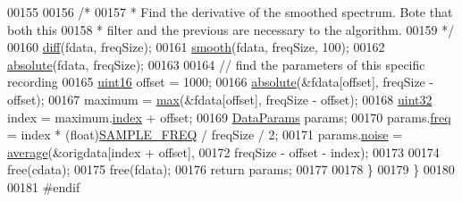 \begin{DoxyCode}
00155 
00156         \textcolor{comment}{/*}
00157 \textcolor{comment}{         * Find the derivative of the smoothed spectrum. Bote that both this}
00158 \textcolor{comment}{         * filter and the previous are necessary to the algorithm.}
00159 \textcolor{comment}{         */}
00160         \hyperlink{namespacevaso_a7d108bce812e906d8b1810815774c7ea}{diff}(fdata, freqSize);
00161         \hyperlink{namespacevaso_a5b7fc1a58199e2cac989f417a9faa1ce}{smooth}(fdata, freqSize, 100);
00162         \hyperlink{namespacevaso_a6ca90add966ce1773fc59a6883e6cd0c}{absolute}(fdata, freqSize);
00163 
00164         \textcolor{comment}{// find the parameters of this specific recording}
00165         \hyperlink{definitions_8hpp_a05f6b0ae8f6a6e135b0e290c25fe0e4e}{uint16} offset = 1000;
00166         \hyperlink{namespacevaso_a6ca90add966ce1773fc59a6883e6cd0c}{absolute}(&fdata[offset], freqSize - offset);
00167         maximum = \hyperlink{namespacevaso_a122846d728be312454a452d379915e10}{max}(&fdata[offset], freqSize - offset);
00168         \hyperlink{definitions_8hpp_a1134b580f8da4de94ca6b1de4d37975e}{uint32} index = maximum.\hyperlink{structMaximum_a2e6aef03795cd285fe542d0861c6e3b5}{index} + offset;
00169         \hyperlink{structDataParams}{DataParams} params;
00170         params.\hyperlink{structDataParams_a12566e017407647bc8287d62554ad3fb}{freq} = index * (float)\hyperlink{definitions_8hpp_a9401e43a8c86acafb31c8e2709baefa1}{SAMPLE\_FREQ} / freqSize / 2;
00171         params.\hyperlink{structDataParams_a4efd1d2231c6fa7c878c9d5e1650738f}{noise} = \hyperlink{namespacevaso_ad3205136b1cd04b4c6b9d7be73661796}{average}(&origdata[index + offset],
00172                 freqSize - offset - index);
00173 
00174         free(cdata);
00175         free(fdata);
00176         \textcolor{keywordflow}{return} params;
00177 
00178     \}
00179 \}
00180 
00181 \textcolor{preprocessor}{#endif}
\end{DoxyCode}
